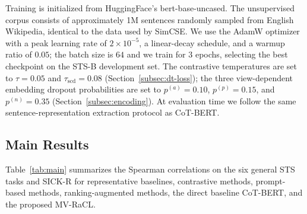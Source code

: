 \documentclass[a4paper,fleqn]{cas-dc}
\begin{document}
Training is initialized from HuggingFace's bert-base-uncased. The unsupervised corpus consists of approximately 1M sentences randomly sampled from English Wikipedia, identical to the data used by SimCSE. We use the AdamW optimizer with a peak learning rate of $2\times 10^{-5}$, a linear-decay schedule, and a warmup ratio of $0.05$; the batch size is $64$ and we train for $3$ epochs, selecting the best checkpoint on the STS-B development set. The contrastive temperatures are set to $\tau = 0.05$ and $\tau_{\mathrm{scd}} = 0.08$ (Section~\ref{subsec:dt-loss}); the three view-dependent embedding dropout probabilities are set to $p^{(a)} = 0.10$, $p^{(p)} = 0.15$, and $p^{(n)} = 0.35$ (Section~\ref{subsec:encoding}). At evaluation time we follow the same sentence-representation extraction protocol as CoT-BERT.

\subsection{Main Results}
\label{subsec:main}

Table~\ref{tab:main} summarizes the Spearman correlations on the six general STS tasks and SICK-R for representative baselines, contrastive methods, prompt-based methods, ranking-augmented methods, the direct baseline CoT-BERT, and the proposed MV-RaCL.
\end{document}
